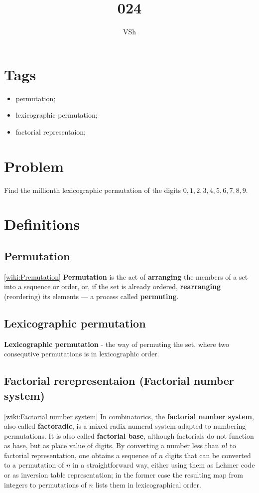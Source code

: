 \documentclass{article}
\begin{document}
\title{024}
\author{VSh}

\maketitle

\section{Tags}
\begin{itemize}
    \item permutation;
    \item lexicographic permutation;
    \item factorial representaion;
\end{itemize}

\section{Problem}
Find the millionth lexicographic permutation of the digits ${0, 1, 2, 3, 4, 5, 6, 7, 8, 9}$.

\section{Definitions}
\subsection{Permutation}
[\href{https://en.wikipedia.org/wiki/Permutation}{wiki:Premutation}]\newline
\textbf{Permutation} is the act of \textbf{arranging} the members of a set into
a sequence or order, or, if the set is already ordered, \textbf{rearranging}
(reordering) its elements — a process called \textbf{permuting}.

\subsection{Lexicographic permutation}
\textbf{Lexicographic permutation} - the way of permuting the set, where two
consequtive permutations is in lexicographic order.

\subsection{Factorial rerepresentaion (Factorial number system)}
[\href{https://en.wikipedia.org/wiki/Factorial_number_system}{wiki:Factorial number system}]\newline
In combinatorics, the \textbf{factorial number system}, also called \textbf{factoradic},
is a mixed radix numeral system adapted to numbering permutations. It is also
called \textbf{factorial base}, although factorials do not function as base,
but as place value of digits. By converting a number less than $n!$ to factorial
representation, one obtains a sequence of $n$ digits that can be converted to a
permutation of $n$ in a straightforward way, either using them as Lehmer code
or as inversion table representation; in the former case the resulting map from
integers to permutations of $n$ lists them in lexicographical order.
\end{document}
